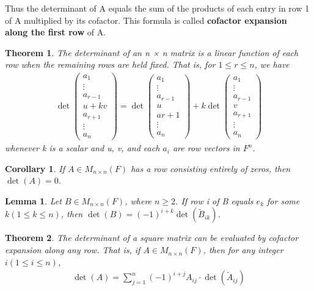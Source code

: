\documentclass{article}
\newcommand{\bd}[1]{\textbf{#1}}
\newcommand*\bpmat[0]{\begin{pmatrix}}
\newcommand*\epmat[0]{\end{pmatrix}}
\theoremstyle{plain}
\newtheorem{theorem}{Theorem}[section]
\newtheorem*{lemma}{Lemma}
\newtheorem*{corollary}{Corollary}
\theoremstyle{plain} %
\begin{document}
Thus the determinant of A equals the sum of the products of each entry in row 1 of A multiplied by its cofactor. This formula is called \bd{cofactor expansion along the first row} of A.

\begin{theorem}
  The determinant of an n × n matrix is a linear function of each row when the remaining rows are held fixed. That is, for $1 \leq  r \leq n$, we have
  \begin{align*}
    \det \bpmat a_1\\\vdots\\a_{r-1}\\u+kv\\a_{r+1}\\\vdots\\a_n\epmat =\det \bpmat a_1\\\vdots\\a_{r-1}\\u\\a{r+1}\\\vdots\\a_n\epmat +k\det \bpmat a_1\\\vdots\\a_{r-1}\\v\\a_{r+1}\\\vdots\\a_n\epmat
  \end{align*}
  whenever k is a scalar and u, v, and each $a_i$ are row vectors in $F^n$.
\end{theorem}

\begin{corollary}
  If $A \in M_{n\times n}(F)$ has a row consisting entirely of zeros, then $\det(A)=0$.
\end{corollary}

\begin{lemma}
  Let $B \in M_{n\times n}(F)$, where $n \geq 2$. If row i of B equals $e_k$ for some $k (1 \leq  k \leq n)$, then $\det(B)=(−1)^{i+k} \det(\tilde{B}_{ik})$.
\end{lemma}

\begin{theorem}
  The determinant of a square matrix can be evaluated by cofactor expansion along any row. That is, if $A \in M_{n\times n}(F)$, then for any integer $i (1 ≤ i ≤ n)$,
  \begin{align*}
    \det(A) = \sum_{j=1}^n {(-1)}^{i+j}A_{ij}\cdot \det(\tilde{A}_{ij})
  \end{align*}
\end{theorem}
\end{document}

